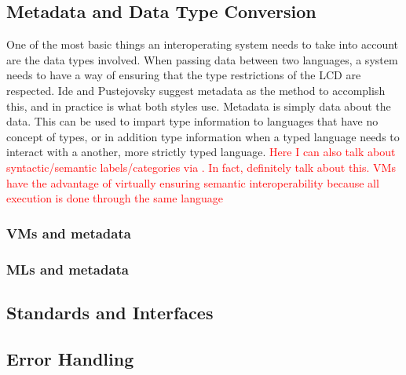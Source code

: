\documentclass{sig-alternate}
\newcommand{\mycomment}[1]{\textcolor{red}{#1}}
\begin{document}
\subsection*{Metadata and Data Type Conversion} \cite{Ide:2010, Bromberg:2011, Hamilton:2003}
One of the most basic things an interoperating system needs to take into account are the data types involved. 
When passing data between two languages, a system needs to have a way of ensuring that the type restrictions of the LCD are respected. Ide and Pustejovsky \cite{Ide:2010} suggest metadata as the method to accomplish this, and in practice is what both styles use. Metadata is simply data about the data. This can be used to impart type information to languages that have no concept of types, or in addition type information when a typed language needs to interact with a another, more strictly typed language.
\mycomment{Here I can also talk about syntactic/semantic labels/categories via \cite{Ide:2010}. In fact, definitely talk about this. VMs have the advantage of virtually ensuring semantic interoperability because all execution is done through the same language}
\subsubsection*{VMs and metadata}

\subsubsection*{MLs and metadata}


\subsection*{Standards and Interfaces} \cite{Shetty:2009}

\subsection*{Error Handling}







  
\end{document}
